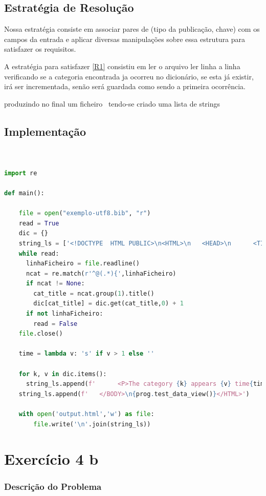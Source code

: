 \documentclass[11pt,a4paper]{report}
\begin{document}
\section{Estratégia de Resolução}

Nossa estratégia consiste em associar pares de (tipo da publicação, chave) com os campos da entrada e aplicar diversas manipulações sobre essa estrutura para satisfazer os requisitos.

A estratégia para satisfazer \ref{R1} consistiu em ler o arquivo ler linha a linha verificando se a categoria encontrada ja ocorreu no dicionário, se esta já existir, irá ser incrementada, senão será guardada como sendo a primeira ocorrência. 

produzindo no final um ficheiro \htlm \ tendo-se criado uma lista de strings 
\section{Implementação}


\begin{lstlisting}[language=python]


import re

def main():
    
    file = open("exemplo-utf8.bib", "r")
    read = True
    dic = {}
    string_ls = ['<!DOCTYPE  HTML PUBLIC>\n<HTML>\n   <HEAD>\n      <TITLE>Categories in BibTeX</TITLE>\n </HEAD>\n   <BODY>']
    while read:
      linhaFicheiro = file.readline()
      ncat = re.match(r'^@(.*){',linhaFicheiro)
      if ncat != None:
        cat_title = ncat.group(1).title()
        dic[cat_title] = dic.get(cat_title,0) + 1
      if not linhaFicheiro:
        read = False
    file.close()

    time = lambda v: 's' if v > 1 else ''

    for k, v in dic.items():
      string_ls.append(f'      <P>The category {k} appears {v} time{time(v)}.</P>')
    string_ls.append(f'   </BODY>\n{prog.test_data_view()}</HTML>')

    with open('output.html','w') as file:
        file.write('\n'.join(string_ls))
\end{lstlisting}

\chapter{Exercício 4 b}

\subsection{Descrição do Problema}
\end{document}
